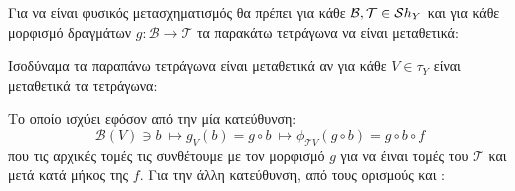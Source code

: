\begin{figure}[H]
    \centering
\end{figure}

\noindent Για να είναι φυσικός μετασχηματισμός θα πρέπει για κάθε $\mathcal{B},\mathcal{T} \in \mathcal{S} h_Y$ και για κάθε μορφισμό δραγμάτων $g:\mathcal{B}\rightarrow \mathcal{T}$ τα παρακάτω τετράγωνα να είναι μεταθετικά:

\begin{figure}[H]
    \centering
\end{figure}


\noindent Ισοδύναμα τα παραπάνω τετράγωνα είναι μεταθετικά αν για κάθε $V \in \tau_Y$ είναι μεταθετικά τα τετράγωνα:

\begin{figure}[H]
    \centering
\end{figure}
\noindent Το οποίο ισχύει εφόσον από την μία κατεύθυνση:
$$\mathcal{B}(V) \ni b \ \longmapsto g_V(b) = g\circ b \ \longmapsto \phi_{\mathcal{T}V} (g\circ b) = g\circ b \circ f$$ που τις αρχικές τομές τις συνθέτουμε με τον μορφισμό $g$ για να έιναι τομές του $\mathcal{T}$ και μετά κατά μήκος της $f$. Για την άλλη κατεύθυνση, από τους ορισμούς  και :


